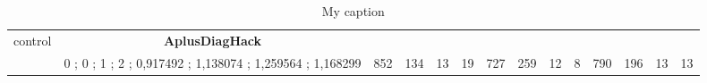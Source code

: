 \begin{table}[]
{\begin{tabular}{|c|c|c|c|c|c|c|c|c|c|c|c|c|c|}
control & \cellcolor{blue!15}\textbf{AplusDiagHack}& {\color[HTML]{00009B} } & {\color[HTML]{9A0000} } & {\color[HTML]{009901} } &  & {\color[HTML]{00009B} } & {\color[HTML]{9A0000} } & {\color[HTML]{009901} } &  & {\color[HTML]{00009B} } & {\color[HTML]{9A0000} } & {\color[HTML]{009901} } &  \\ 
 & \cellcolor{ blue!15}0 ; 0 ; 1 ; 2 ; 0,917492 ; 1,138074 ; 1,259564 ; 1,168299 & \multirow{-2}{*}{{\color[HTML]{00009B} 852}} & \multirow{-2}{*}{{\color[HTML]{9A0000} 134}} & \multirow{-2}{*}{{\color[HTML]{009901} 13}} & \multirow{-2}{*}{19} & \multirow{-2}{*}{{\color[HTML]{00009B} 727}} & \multirow{-2}{*}{{\color[HTML]{9A0000} 259}} & \multirow{-2}{*}{{\color[HTML]{009901} 12}} & \multirow{-2}{*}{8} & \multirow{-2}{*}{{\color[HTML]{00009B} 790}} & \multirow{-2}{*}{{\color[HTML]{9A0000} 196}} & \multirow{-2}{*}{{\color[HTML]{009901} 13}} & \multirow{-2}{*}{13} \\ \hline
\end{tabular}} \caption{ My caption} \label{ my - label} \end{table}
